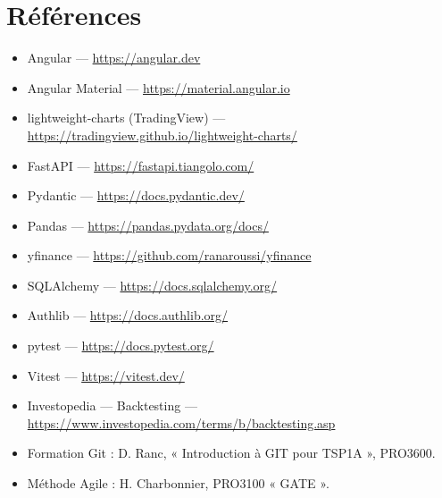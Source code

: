 \documentclass[11pt,a4paper]{article}
\begin{document}
\section{Références}
\begin{itemize}[leftmargin=1.4em]
  \item Angular --- \url{https://angular.dev}
  \item Angular Material --- \url{https://material.angular.io}
  \item lightweight-charts (TradingView) --- \url{https://tradingview.github.io/lightweight-charts/}
  \item FastAPI --- \url{https://fastapi.tiangolo.com/}
  \item Pydantic --- \url{https://docs.pydantic.dev/}
  \item Pandas --- \url{https://pandas.pydata.org/docs/}
  \item yfinance --- \url{https://github.com/ranaroussi/yfinance}
  \item SQLAlchemy --- \url{https://docs.sqlalchemy.org/}
  \item Authlib --- \url{https://docs.authlib.org/}
  \item pytest --- \url{https://docs.pytest.org/}
  \item Vitest --- \url{https://vitest.dev/}
  \item Investopedia --- Backtesting --- \url{https://www.investopedia.com/terms/b/backtesting.asp}
  \item Formation Git : D. Ranc, « Introduction à GIT pour TSP1A », PRO3600.
  \item Méthode Agile : H. Charbonnier, PRO3100 « GATE ».
\end{itemize}

\end{document}
